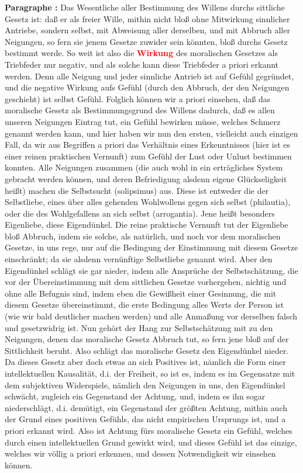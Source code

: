 \documentclass[a4paper,12pt,twoside]{book}
\newcommand{\match}[1]{\textcolor{red}{\textbf{#1}}}
\begin{document}
	\noindent\textbf{Paragraphe : }Das Wesentliche aller Bestimmung des Willens durchs sittliche Gesetz ist: daß er als freier Wille, mithin nicht bloß ohne Mitwirkung sinnlicher Antriebe, sondern selbst, mit Abweisung aller derselben, und mit Abbruch aller Neigungen, so fern sie jenem Gesetze zuwider sein könnten, bloß durchs Gesetz bestimmt werde. So weit ist also die \match{Wirkung} des moralischen Gesetzes als Triebfeder nur negativ, und als solche kann diese Triebfeder a priori erkannt werden. Denn alle Neigung und jeder sinnliche Antrieb ist auf Gefühl gegründet, und die negative Wirkung aufs Gefühl (durch den Abbruch, der den Neigungen geschieht) ist selbst Gefühl. Folglich können wir a priori einsehen, daß das moralische  Gesetz als Bestimmungsgrund des Willens dadurch, daß es allen unseren Neigungen Eintrag tut, ein Gefühl bewirken müsse, welches Schmerz genannt werden kann, und hier haben wir nun den ersten, vielleicht auch einzigen Fall, da wir aus Begriffen a priori das Verhältnis eines Erkenntnisses (hier ist es einer reinen praktischen Vernunft) zum Gefühl der Lust oder Unlust bestimmen konnten. Alle Neigungen zusammen (die auch wohl in ein erträgliches System gebracht werden können, und deren Befriedigung alsdenn eigene Glückseligkeit heißt) machen die Selbstsucht (solipsimus) aus. Diese ist entweder die der Selbstliebe, eines über alles gehenden Wohlwollens gegen sich selbst (philautia), oder die des Wohlgefallens an sich selbst (arrogantia). Jene heißt besonders Eigenliebe, diese Eigendünkel. Die reine praktische Vernunft tut der Eigenliebe bloß Abbruch, indem sie solche, als natürlich, und noch vor dem moralischen Gesetze, in uns rege, nur auf die Bedingung der Einstimmung mit diesem Gesetze einschränkt; da sie alsdenn vernünftige Selbstliebe genannt wird. Aber den Eigendünkel schlägt sie gar nieder, indem alle Ansprüche der Selbstschätzung, die vor der Übereinstimmung mit dem sittlichen Gesetze vorhergehen, nichtig und ohne alle Befugnis sind, indem eben die Gewißheit einer Gesinnung, die mit diesem Gesetze übereinstimmt, die erste Bedingung alles Werts der Person ist (wie wir bald deutlicher machen werden) und alle Anmaßung vor derselben falsch und gesetzwidrig ist. Nun gehört der Hang zur Selbstschätzung mit zu den Neigungen, denen das moralische Gesetz Abbruch tut, so fern jene bloß auf der Sittlichkeit beruht. Also schlägt das moralische Gesetz den Eigendünkel nieder. Da dieses Gesetz aber doch etwas an sich Positives ist, nämlich die Form einer intellektuellen Kausalität, d.i. der Freiheit, so ist es, indem es im Gegensatze mit dem subjektiven Widerspiele, nämlich den Neigungen in uns, den Eigendünkel schwächt, zugleich ein Gegenstand der Achtung, und, indem es ihn sogar niederschlägt, d.i. demütigt, ein Gegenstand der größten Achtung, mithin  auch der Grund eines positiven Gefühls, das nicht empirischen Ursprungs ist, und a priori erkannt wird. Also ist Achtung fürs moralische Gesetz ein Gefühl, welches durch einen intellektuellen Grund gewirkt wird, und dieses Gefühl ist das einzige, welches wir völlig a priori erkennen, und dessen Notwendigkeit wir einsehen können. 
	
\end{document}
